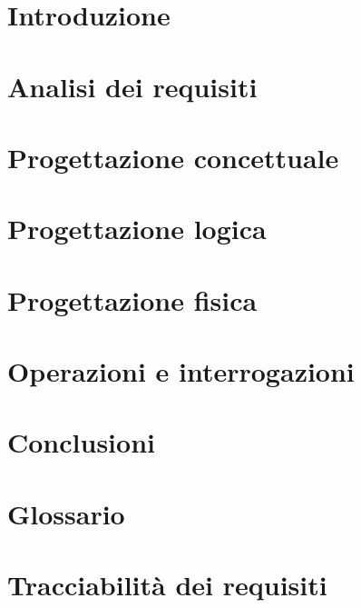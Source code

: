 \documentclass[11pt, a4paper]{report}
\begin{document}
    \tableofcontents
    \newpage

    \chapter{Introduzione}
    

    \chapter{Analisi dei requisiti}
    

    \chapter{Progettazione concettuale}
    

    \chapter{Progettazione logica}
    

    

    \chapter{Progettazione fisica}
    

    \chapter{Operazioni e interrogazioni}
    

    \chapter{Conclusioni}
    

    \appendix
    \chapter{Glossario}
    

    \chapter{Tracciabilità dei requisiti}
    
\end{document}
